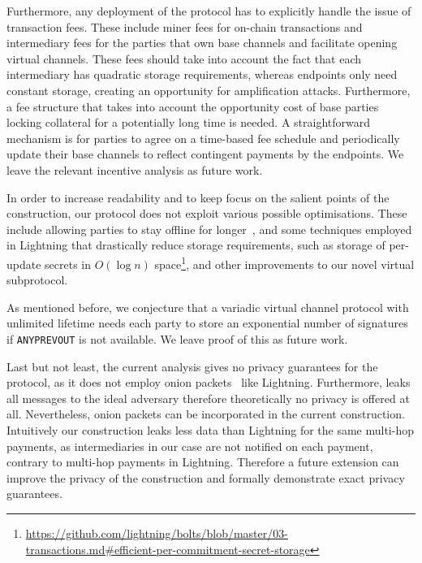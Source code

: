   Furthermore, any deployment of the protocol has to explicitly handle the issue
  of transaction fees. These include miner fees for on-chain transactions and
  intermediary fees for the parties that own base channels and facilitate
  opening virtual channels. These fees should take into account the fact that
  each intermediary has quadratic storage requirements, whereas endpoints only
  need constant storage, creating an opportunity for amplification attacks.
  Furthermore, a fee structure that takes into account the opportunity cost of
  base parties locking collateral for a potentially long time is needed. A
  straightforward mechanism is for parties to agree on a time-based fee schedule
  and periodically update their base channels to reflect contingent payments by
  the endpoints. We leave the relevant incentive analysis as future work.

  In order to increase readability and to keep focus on the salient points of
  the construction, our protocol does not exploit various possible
  optimisations. These include allowing parties to stay offline for
  longer~\cite{DBLP:conf/ccs/AumayrTMMM22}, and some techniques employed in Lightning that
  drastically reduce storage requirements, such as storage of per-update secrets
  in $O(\log n)$
  space\footnote{\url{https://github.com/lightning/bolts/blob/master/03-transactions.md\#efficient-per-commitment-secret-storage}},
  and other improvements to our novel virtual subprotocol.

  As mentioned before, we conjecture that a variadic virtual
  channel protocol with unlimited lifetime needs each party to store an
  exponential number of signatures if \texttt{ANYPREVOUT} is not available. We
  leave proof of this as future work.

  Last but not least, the current analysis gives no privacy guarantees for the
  protocol, as it does not employ onion packets~\cite{sphinx} like Lightning.
  Furthermore, \fchan leaks all messages to the ideal adversary therefore
  theoretically no privacy is offered at all. Nevertheless, onion packets can be
  incorporated in the current construction. Intuitively our construction
  leaks less data than Lightning for the same multi-hop payments, as
  intermediaries in our case are not notified on each payment, contrary to
  multi-hop payments in Lightning. Therefore a future extension can improve the
  privacy of the construction and formally demonstrate exact privacy guarantees.
